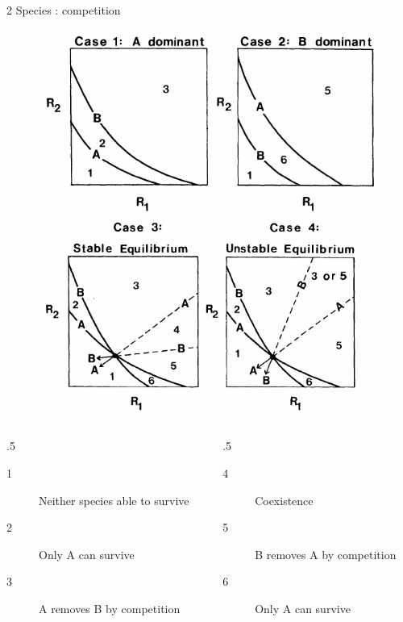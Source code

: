 \documentclass[final,xcolor=dvipsnames]{beamer}
\begin{document}
\begin{frame}{2 Species : competition}  
\begin{figure}
       \includegraphics[width=.5\framewidth]{NoCohabitation.png}
       \includegraphics[width=.5\framewidth]{Cohabitation.png}
    \end{figure}
    \begin{columns}
             \begin{column}{.5\framewidth}
              \begin{description}
\item[1] Neither species able to survive
\item[2] Only A can survive
\item[3] A removes B by competition
\end{description}
    \end{column}
        \begin{column}{.5\framewidth}
                          \begin{description}
\item[4] Coexistence
\item[5] B removes A by competition
\item[6] Only A can survive
\end{description}
    \end{column}
    \end{columns}
\end{frame}
\end{document}
